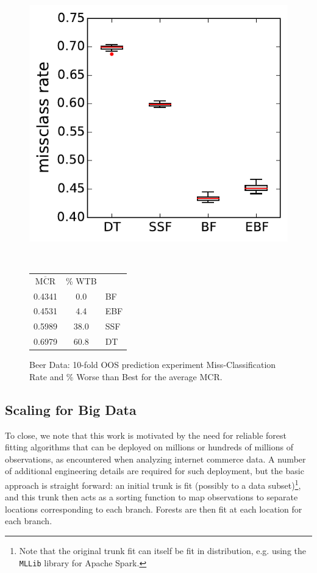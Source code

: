 \documentclass{article}
\begin{document}
\begin{figure}
\begin{minipage}{0.5\linewidth}
\includegraphics[width=\textwidth]{../graphs/beer}
\end{minipage}
~~
\begin{minipage}{0.4\linewidth}
{\footnotesize
\begin{tabular}{c c | l}
$\overline{\text{MCR}}$  & \% WTB & \\
\cline{1-2}\rule{0pt}{3ex} 
0.4341 &  0.0 & BF \\
0.4531 &  4.4 & EBF \\
0.5989 & 38.0 & SSF \\
0.6979 & 60.8 & DT \\
\end{tabular}}
\end{minipage}
\caption{\label{beer} Beer Data: 10-fold OOS prediction experiment Miss-Classification Rate and \% Worse than Best for the average MCR. }
\end{figure}

\subsection{Scaling for Big Data}

To close, we note that this work is motivated by the need for reliable forest fitting algorithms that can be deployed on millions or hundreds of millions of observations, as encountered when analyzing internet commerce data.  A number of additional engineering details are required for such deployment, but the basic approach is straight forward:  an initial trunk is fit (possibly to a data subset)\footnote{Note that the original trunk fit can itself be fit in distribution, e.g. using the \texttt{MLLib} library for Apache Spark.}, and this trunk then acts as a sorting function to map observations to 
separate locations corresponding to each branch.  Forests are then fit at each location for each branch.  
\end{document}
